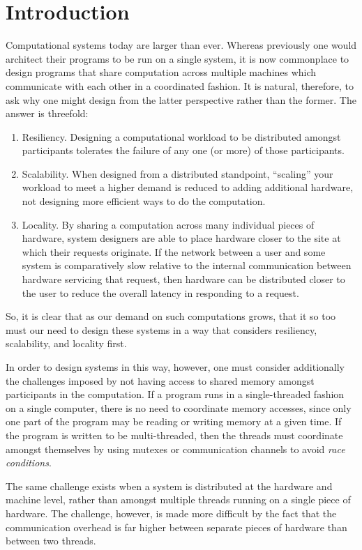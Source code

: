 \chapter{Introduction}

Computational systems today are larger than ever. Whereas previously one would
architect their programs to be run on a single system, it is now commonplace to
design programs that share computation across multiple machines which
communicate with each other in a coordinated fashion. It is natural, therefore,
to ask why one might design from the latter perspective rather than the former.
The answer is threefold:
\begin{enumerate}
  \item Resiliency. Designing a computational workload to be distributed amongst
    participants tolerates the failure of any one (or more) of those
    participants.
  \item Scalability. When designed from a distributed standpoint, ``scaling''
    your workload to meet a higher demand is reduced to adding additional
    hardware, not designing more efficient ways to do the computation.
  \item Locality. By sharing a computation across many individual pieces of
    hardware, system designers are able to place hardware closer to the site at
    which their requests originate. If the network between a user and some
    system is comparatively slow relative to the internal communication between
    hardware servicing that request, then hardware can be distributed closer to
    the user to reduce the overall latency in responding to a request.
\end{enumerate}

So, it is clear that as our demand on such computations grows, that it so too
must our need to design these systems in a way that considers resiliency,
scalability, and locality first.

In order to design systems in this way, however, one must consider additionally
the challenges imposed by not having access to shared memory amongst
participants in the computation. If a program runs in a single-threaded fashion
on a single computer, there is no need to coordinate memory accesses, since only
one part of the program may be reading or writing memory at a given time. If the
program is written to be multi-threaded, then the threads must coordinate
amongst themselves by using mutexes or communication channels to avoid
\textit{race conditions}.

The same challenge exists wben a system is distributed at the hardware and
machine level, rather than amongst multiple threads running on a single piece of
hardware. The challenge, however, is made more difficult by the fact that the
communication overhead is far higher between separate pieces of hardware than
between two threads.

